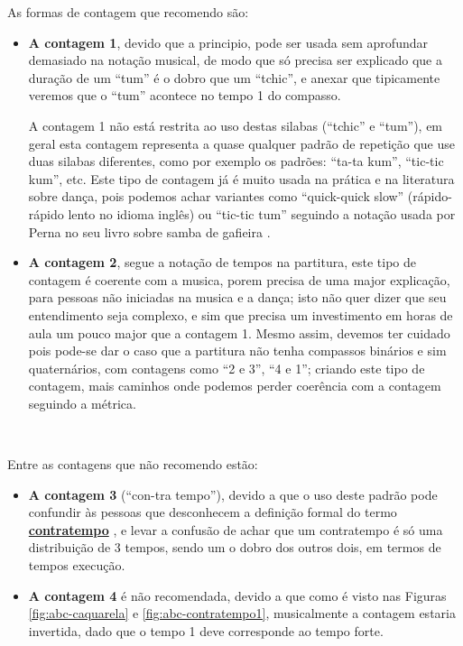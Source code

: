As formas de contagem que recomendo são:
\begin{itemize}
\item \textbf{A contagem 1}, 
devido que a principio, pode ser usada sem aprofundar demasiado 
na notação musical, de modo que só precisa ser explicado que a duração de um 
``tum'' é o dobro que um ``tchic'', e anexar que tipicamente veremos que o ``tum''
acontece no tempo 1 do compasso.

A contagem 1 não está restrita ao uso destas silabas (``tchic'' e ``tum''), 
em geral esta contagem representa a quase qualquer padrão de repetição
que use duas silabas diferentes, como por exemplo os padrões: ``ta-ta kum'', ``tic-tic kum'', etc. 
Este tipo de contagem já é muito usada na prática e na literatura sobre dança, pois 
podemos achar variantes como ``quick-quick slow'' (rápido-rápido lento no idioma inglês)
ou ``tic-tic tum'' seguindo a notação usada por Perna no seu livro sobre samba de gafieira \cite[pp. 146]{perna2002samba}.
\item \textbf{A contagem 2}, segue a notação de tempos na partitura, este tipo de
contagem é coerente com a musica, porem precisa de uma major explicação, 
para pessoas não iniciadas na musica e a dança; isto não quer dizer que seu
entendimento seja complexo, e sim que precisa um investimento em horas de aula
um pouco major que a contagem 1.
Mesmo assim, devemos ter cuidado pois pode-se dar o caso que a partitura não tenha compassos binários 
e sim quaternários, com contagens como ``2 e 3'', ``4 e 1''; 
criando este tipo de contagem, mais caminhos onde podemos perder coerência com a contagem seguindo a métrica.
\end{itemize}~


Entre as contagens que não recomendo estão:
\begin{itemize}
\item \textbf{A contagem 3} (``con-tra tempo''), 
devido a que o uso deste padrão pode confundir às pessoas que desconhecem 
a definição formal do termo \hyperref[sec:contratempo]{\textbf{contratempo}} 
\cite[pp. 16]{mascarenhascurso} \cite[pp. 36]{azevedocompor}, 
e levar a confusão de achar que um contratempo é só uma distribuição de 3 tempos, 
sendo um o dobro dos outros dois, em termos de tempos execução.
\item \textbf{A contagem 4} é não recomendada, devido a que como é visto nas Figuras 
\ref{fig:abc-caquarela} e \ref{fig:abc-contratempo1}, musicalmente a contagem estaria invertida,
dado que o tempo 1 deve corresponde ao tempo forte.
\end{itemize}~

